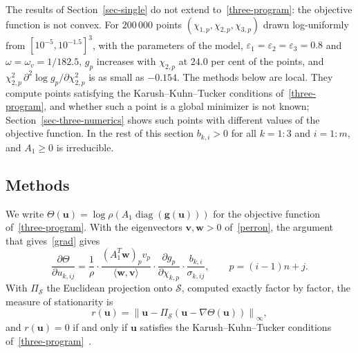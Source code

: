 \documentclass[11pt]{article}
\theoremstyle{plain}
\theoremstyle{definition}
\theoremstyle{remark}
\numberwithin{equation}{section}
\numberwithin{figure}{section}
\numberwithin{table}{section}
\numberwithin{algorithm}{section}
\begin{document}
The results of Section~\ref{sec-single} do not extend to~\eqref{three-program}:
the objective function is not convex. For $200\,000$ points
$(\chi_{1,p},\chi_{2,p},\chi_{3,p})$ drawn log-uniformly from
$\left[10^{-5},10^{-1.5}\right]^3$, with the parameters of the model,
$\varepsilon_1=\varepsilon_2=\varepsilon_3=0.8$ and $\omega=\omega_v=1/182.5$,
$g_p$ increases with $\chi_{2,p}$ at $24.0$ per cent of the points, and
$\chi_{2,p}^2\,\partial^2\log g_p/\partial \chi_{2,p}^2$ is as small as
$-0.154$. The methods below are local. They compute points satisfying the
Karush--Kuhn--Tucker conditions of~\eqref{three-program}, and whether such a
point is a global minimizer is not known; Section~\ref{sec-three-numerics}
shows such points with different values of the objective function. In the rest
of this section $b_{k,i}>0$ for all $k=1:3$ and $i=1:m$, and $A_1\ge 0$ is
irreducible.

\subsection{Methods}\label{sec-alternating}

We write
$\Theta(\bm u)=\log\rho\left(A_1\operatorname{diag}\left(\bm g(\bm u)\right)\right)$
for the objective function of~\eqref{three-program}. With the eigenvectors
$\bm v,\bm w>0$ of~\eqref{perron}, the argument that gives~\eqref{grad} gives
\begin{equation}\label{t-grad}
\frac{\partial\Theta}{\partial u_{k,ij}}
=\frac{1}{\rho}\cdot\frac{\left(A_1^T\bm w\right)_pv_p}{\langle\bm w,\bm v\rangle}
\cdot\frac{\partial g_p}{\partial \chi_{k,p}}\cdot\frac{b_{k,i}}{\sigma_{k,ij}},
\qquad p=(i-1)n+j .
\end{equation}
With $\Pi_{\mathcal{S}}$ the Euclidean projection onto $\mathcal{S}$, computed
exactly factor by factor, the measure of stationarity is
\begin{equation}\label{t-r}
r(\bm u)=\left\|\bm u-\Pi_{\mathcal{S}}\left(\bm u-\nabla\Theta(\bm u)\right)\right\|_\infty ,
\end{equation}
and $r(\bm u)=0$ if and only if $\bm u$ satisfies the Karush--Kuhn--Tucker
conditions of~\eqref{three-program}~\cite[Section 4.2.3]{2004Boyd_Vandenberghe}.
\end{document}
